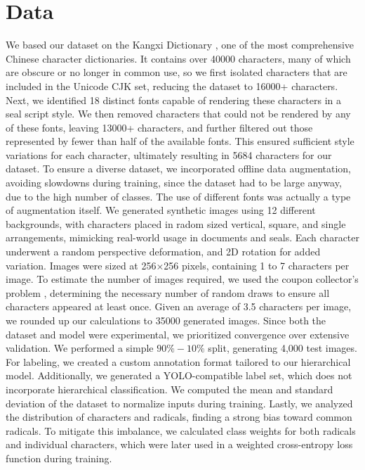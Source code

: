 \section{Data}
\label{sec:data}

We based our dataset on the Kangxi Dictionary \cite{WikipediaKangxi}, one of the most comprehensive Chinese character dictionaries. It contains over 40000 characters, many of which are obscure or no longer in common use, so we first isolated characters that are included in the Unicode CJK set, reducing the dataset to 16000+ characters.
Next, we identified 18 distinct fonts capable of rendering these characters in a seal script style. We then removed characters that could not be rendered by any of these fonts, leaving 13000+ characters, and further filtered out those represented by fewer than half of the available fonts. This ensured sufficient style variations for each character, ultimately resulting in 5684 characters for our dataset. To ensure a diverse dataset, we incorporated offline data augmentation, avoiding slowdowns during training, since the dataset had to be large anyway, due to the high number of classes. The use of different fonts was actually a type of augmentation itself. We generated synthetic images using 12 different backgrounds, with characters placed in radom sized vertical, square, and single arrangements, mimicking real-world usage in documents and seals. Each character underwent a random perspective deformation, and 2D rotation for added variation. Images were sized at 256×256 pixels, containing 1 to 7 characters per image.
To estimate the number of images required, we used the coupon collector’s problem \cite{CouponCollectorProblem}, determining the necessary number of random draws to ensure all characters appeared at least once.
Given an average of 3.5 characters per image, we rounded up our calculations to 35000 generated images. Since both the dataset and model were experimental, we prioritized convergence over extensive validation. We performed a simple $90\%-10\%$ split, generating 4,000 test images.
For labeling, we created a custom annotation format tailored to our hierarchical model. Additionally, we generated a YOLO-compatible label set, which does not incorporate hierarchical classification. We computed the mean and standard deviation of the dataset to normalize inputs during training. Lastly, we analyzed the distribution of characters and radicals, finding a strong bias toward common radicals. To mitigate this imbalance, we calculated class weights for both radicals and individual characters, which were later used in a weighted cross-entropy loss function during training.

